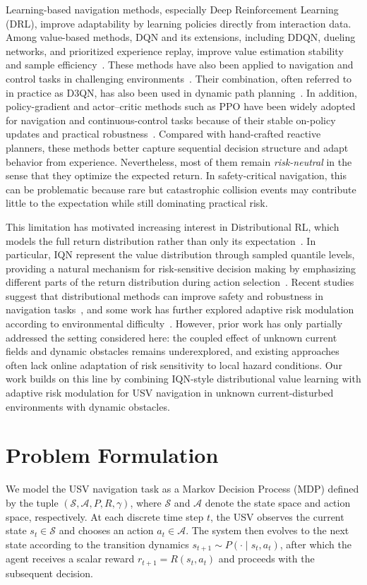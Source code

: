 \documentclass[runningheads]{llncs}
\begin{document}
Learning-based navigation methods, especially Deep Reinforcement Learning (DRL), improve adaptability by learning policies directly from interaction data. Among value-based methods, DQN and its extensions, including DDQN, dueling networks, and prioritized experience replay, improve value estimation stability and sample efficiency~\cite{ref39,ref40,ref41,ref42}. These methods have also been applied to navigation and control tasks in challenging environments~\cite{ref31,ref32,ref34,ref35}. Their combination, often referred to in practice as D3QN, has also been used in dynamic path planning~\cite{ref43}. In addition, policy-gradient and actor--critic methods such as PPO have been widely adopted for navigation and continuous-control tasks because of their stable on-policy updates and practical robustness~\cite{ref44,ref45}. Compared with hand-crafted reactive planners, these methods better capture sequential decision structure and adapt behavior from experience. Nevertheless, most of them remain \emph{risk-neutral} in the sense that they optimize the expected return. In safety-critical navigation, this can be problematic because rare but catastrophic collision events may contribute little to the expectation while still dominating practical risk.

This limitation has motivated increasing interest in Distributional RL, which models the full return distribution rather than only its expectation~\cite{ref7,ref8}. In particular, IQN represent the value distribution through sampled quantile levels, providing a natural mechanism for risk-sensitive decision making by emphasizing different parts of the return distribution during action selection~\cite{ref8}. Recent studies suggest that distributional methods can improve safety and robustness in navigation tasks~\cite{ref36,ref37}, and some work has further explored adaptive risk modulation according to environmental difficulty~\cite{ref38}. However, prior work has only partially addressed the setting considered here: the coupled effect of unknown current fields and dynamic obstacles remains underexplored, and existing approaches often lack online adaptation of risk sensitivity to local hazard conditions. Our work builds on this line by combining IQN-style distributional value learning with adaptive risk modulation for USV navigation in unknown current-disturbed environments with dynamic obstacles.


\section{Problem Formulation}
We model the USV navigation task as a Markov Decision Process (MDP) defined by the tuple $(\mathcal{S}, \mathcal{A}, P, R, \gamma)$, where $\mathcal{S}$ and $\mathcal{A}$ denote the state space and action space, respectively. At each discrete time step $t$, the USV observes the current state $s_t \in \mathcal{S}$ and chooses an action $a_t \in \mathcal{A}$. The system then evolves to the next state according to the transition dynamics $s_{t+1} \sim P(\cdot \mid s_t, a_t)$, after which the agent receives a scalar reward $r_{t+1} = R(s_t, a_t)$ and proceeds with the subsequent decision.
\end{document}
